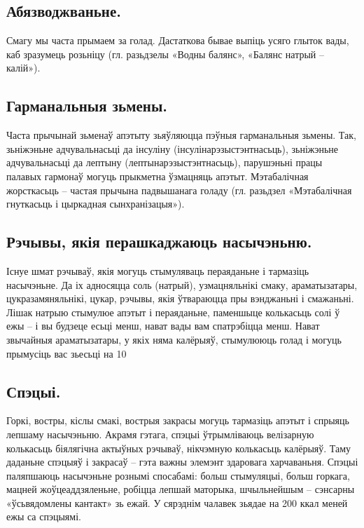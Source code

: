 \subsection{Абязводжваньне.}
Смагу мы часта прымаем за голад. Дастаткова бывае выпіць усяго глыток вады, каб зразумець розьніцу (гл. разьдзелы «Водны балянс», «Балянс натрый – калій»).

\subsection{Гарманальныя зьмены.}
Часта прычынай зьменаў апэтыту зьяўляюцца пэўныя гарманальныя зьмены. Так, зьніжэньне адчувальнасьці да інсуліну (інсулінарэзыстэнтнасьць), зьніжэньне адчувальнасьці да лептыну (лептынарэзыстэнтнасьць), парушэньні працы палавых гармонаў могуць прыкметна ўзмацняць апэтыт. Мэтабалічная жорсткасьць – частая прычына падвышанага голаду (гл. разьдзел «Мэтабалічная гнуткасьць і цыркадная сынхранізацыя»).

\subsection{Рэчывы, якія перашкаджаюць насычэньню.}
Існуе шмат рэчываў, якія могуць стымуляваць пераяданьне і тармазіць насычэньне. Да іх адносяцца соль (натрый), узмацняльнікі смаку, араматызатары, цукразамяняльнікі, цукар, рэчывы, якія ўтвараюцца пры вэнджаньні і смажаньні. Лішак натрыю стымулюе апэтыт і пераяданьне, паменшыце колькасьць солі ў ежы – і вы будзеце есьці менш, нават вады вам спатрэбіцца менш. Нават звычайныя араматызатары, у якіх няма калёрыяў, стымулююць голад і могуць прымусіць вас зьесьці на 10%

\subsection{Спэцыі.}
Горкі, востры, кіслы смакі, вострыя закрасы могуць тармазіць апэтыт і спрыяць лепшаму насычэньню. Акрамя гэтага, спэцыі ўтрымліваюць велізарную колькасьць біялягічна актыўных рэчываў, нікчэмную колькасьць калёрыяў. Таму даданьне спэцыяў і закрасаў – гэта важны элемэнт здаровага харчаваньня. Спэцыі паляпшаюць насычэньне рознымі спосабамі: больш стымуляцыі, больш горкага, мацней жоўцеаддзяленьне, робіцца лепшай маторыка, шчыльнейшым – сэнсарны «ўсьвядомлены кантакт» зь ежай. У сярэднім чалавек зьядае на 200 ккал меней ежы са спэцыямі.

